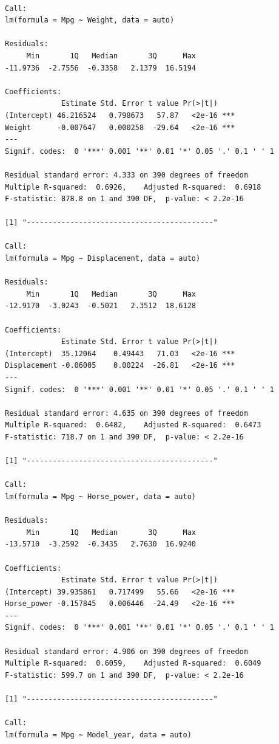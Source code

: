 \documentclass[
]{article}
\begin{document}
\begin{verbatim}

Call:
lm(formula = Mpg ~ Weight, data = auto)

Residuals:
     Min       1Q   Median       3Q      Max 
-11.9736  -2.7556  -0.3358   2.1379  16.5194 

Coefficients:
             Estimate Std. Error t value Pr(>|t|)    
(Intercept) 46.216524   0.798673   57.87   <2e-16 ***
Weight      -0.007647   0.000258  -29.64   <2e-16 ***
---
Signif. codes:  0 '***' 0.001 '**' 0.01 '*' 0.05 '.' 0.1 ' ' 1

Residual standard error: 4.333 on 390 degrees of freedom
Multiple R-squared:  0.6926,    Adjusted R-squared:  0.6918 
F-statistic: 878.8 on 1 and 390 DF,  p-value: < 2.2e-16

[1] "-------------------------------------------"

Call:
lm(formula = Mpg ~ Displacement, data = auto)

Residuals:
     Min       1Q   Median       3Q      Max 
-12.9170  -3.0243  -0.5021   2.3512  18.6128 

Coefficients:
             Estimate Std. Error t value Pr(>|t|)    
(Intercept)  35.12064    0.49443   71.03   <2e-16 ***
Displacement -0.06005    0.00224  -26.81   <2e-16 ***
---
Signif. codes:  0 '***' 0.001 '**' 0.01 '*' 0.05 '.' 0.1 ' ' 1

Residual standard error: 4.635 on 390 degrees of freedom
Multiple R-squared:  0.6482,    Adjusted R-squared:  0.6473 
F-statistic: 718.7 on 1 and 390 DF,  p-value: < 2.2e-16

[1] "-------------------------------------------"

Call:
lm(formula = Mpg ~ Horse_power, data = auto)

Residuals:
     Min       1Q   Median       3Q      Max 
-13.5710  -3.2592  -0.3435   2.7630  16.9240 

Coefficients:
             Estimate Std. Error t value Pr(>|t|)    
(Intercept) 39.935861   0.717499   55.66   <2e-16 ***
Horse_power -0.157845   0.006446  -24.49   <2e-16 ***
---
Signif. codes:  0 '***' 0.001 '**' 0.01 '*' 0.05 '.' 0.1 ' ' 1

Residual standard error: 4.906 on 390 degrees of freedom
Multiple R-squared:  0.6059,    Adjusted R-squared:  0.6049 
F-statistic: 599.7 on 1 and 390 DF,  p-value: < 2.2e-16

[1] "-------------------------------------------"

Call:
lm(formula = Mpg ~ Model_year, data = auto)


\end{verbatim}
\end{document}
